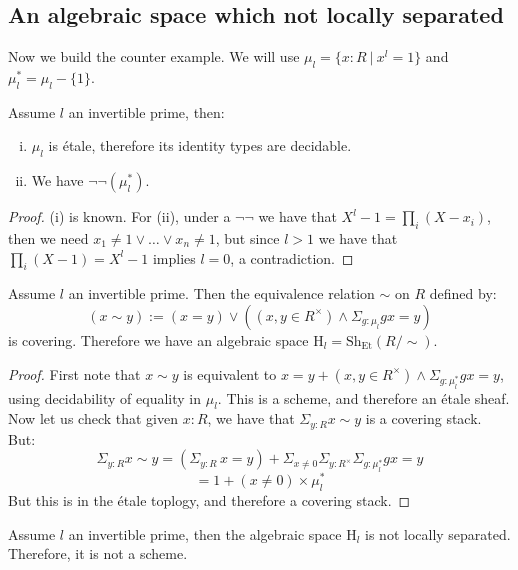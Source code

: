 \subsection{An algebraic space which not locally separated}

Now we build the counter example. We will use $\mu_l = \{x:R\ |\ x^l=1\}$ and $\mu_l^* = \mu_l-\{1\}$. 

\begin{lemma}\label{basics-mul}
Assume $l$ an invertible prime, then: 
\begin{enumerate}[(i)]
\item $\mu_l$ is étale, therefore its identity types are decidable.
\item We have $\neg\neg(\mu_l^*)$.
\end{enumerate}
\end{lemma}

\begin{proof}
(i) is known. For (ii), under a $\neg\neg$ we have that $X^l -1 = \prod_i(X-x_i)$, then we need $x_1\not=1\lor\hdots \lor x_n\not=1$, but since $l > 1$ we have that $\prod_i(X-1) = X^l-1$ implies $l=0$, a contradiction.
\end{proof}

\begin{lemma}
Assume $l$ an invertible prime. Then the equivalence relation $\sim$ on $R$ defined by:
\[(x\sim y) :=  (x=y) \lor ((x,y\in R^\times) \land \Sigma_{g:\mu_l} gx=y)\]
is covering. Therefore we have an algebraic space $\mathrm{H}_l = \mathrm{Sh}_{\mathrm{Et}}(R/\sim)$.
\end{lemma}

\begin{proof}
First note that $x\sim y$ is equivalent to $x=y + (x,y\in R^\times) \land \Sigma_{g:\mu_l^*} gx=y$, using decidability of equality in $\mu_l$. This is a scheme, and therefore an étale sheaf. Now let us check that given $x:R$, we have that $\Sigma_{y:R}x\sim y$ is a covering stack. But:
\[\Sigma_{y:R}x\sim y = (\Sigma_{y:R}\, x=y) + \Sigma_{x\not=0}\Sigma_{y:R^\times} \Sigma_{g:\mu_l^*}gx=y\]
\[ = 1 + (x\not=0)\times \mu_l^*\]
But this is in the étale toplogy, and therefore a covering stack.
\end{proof}

\begin{proposition}\label{non-locally-separated-algebraic-space}
Assume $l$ an invertible prime, then the algebraic space $\mathrm{H}_l$ is not locally separated. Therefore, it is not a scheme.
\end{proposition}

